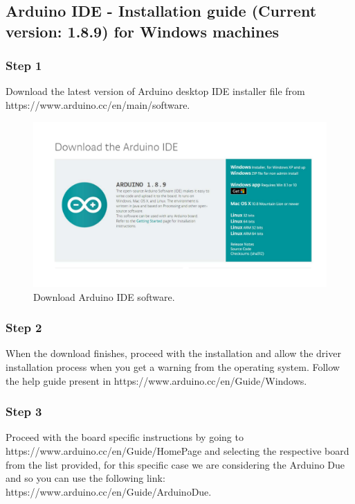 \begin{refsection}
	\subsection{Arduino IDE - Installation guide (Current version: 1.8.9) for Windows machines}
	
	\subsubsection{Step 1}
	
	Download the latest version of Arduino desktop IDE installer file from https://www.arduino.cc/en/main/software.
	
	\begin{figure}[H]
		\centering
		\includegraphics[width=0.86\linewidth]{./sdf/arduino_quantum_rx/figures/arduinoDownload.pdf}
		\caption{Download Arduino IDE software.}
		\label{arduinoDownload}
	\end{figure}
	
	
	\subsubsection{Step 2}
	
	When the download finishes, proceed with the installation and allow the driver installation process when you get a warning from the operating system. Follow the help guide present in https://www.arduino.cc/en/Guide/Windows.
	
	\subsubsection{Step 3}
	
	Proceed with the board specific instructions by going to https://www.arduino.cc/en/Guide/HomePage and selecting the respective board from the list provided, for this specific case we are considering the Arduino Due and so you can use the following link: https://www.arduino.cc/en/Guide/ArduinoDue.
	

\end{refsection}
